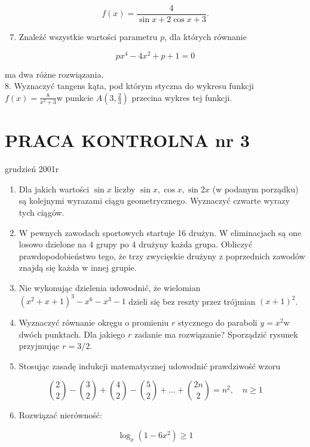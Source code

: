\documentclass[10pt]{article}
\begin{document}
$$
f(x)=\frac{4}{\sin x+2 \cos x+3} .
$$

\begin{enumerate}
  \setcounter{enumi}{6}
  \item Znaleźć wszystkie wartości parametru $p$, dla których równanie
\end{enumerate}

$$
p x^{4}-4 x^{2}+p+1=0
$$

ma dwa różne rozwiązania.\\
8. Wyznaczyć tangens kąta, pod którym styczna do wykresu funkcji $f(x)=\frac{8}{x^{2}+3} \mathrm{w}$ punkcie $A\left(3, \frac{2}{3}\right)$ przecina wykres tej funkcji.

\section*{PRACA KONTROLNA nr 3}
grudzień 2001r

\begin{enumerate}
  \item Dla jakich wartości $\sin x$ liczby $\sin x, \cos x, \sin 2 x$ (w podanym porządku) są kolejnymi wyrazami ciągu geometrycznego. Wyznaczyć czwarte wyrazy tych ciągów.
  \item W pewnych zawodach sportowych startuje 16 drużyn. W eliminacjach są one losowo dzielone na 4 grupy po 4 drużyny każda grupa. Obliczyć prawdopodobieństwo tego, że trzy zwycięskie drużyny z poprzednich zawodów znajdą się każda w innej grupie.
  \item Nie wykonując dzielenia udowodnić, że wielomian $\left(x^{2}+x+1\right)^{3}-x^{6}-x^{3}-1$ dzieli się bez reszty przez trójmian $(x+1)^{2}$.
  \item Wyznaczyć równanie okręgu o promieniu $r$ stycznego do paraboli $y=x^{2} \mathrm{w}$ dwóch punktach. Dla jakiego $r$ zadanie ma rozwiązanie? Sporządzić rysunek przyjmując $r=3 / 2$.
  \item Stosując zasadę indukcji matematycznej udowodnić prawdziwość wzoru
\end{enumerate}

$$
\binom{2}{2}-\binom{3}{2}+\binom{4}{2}-\binom{5}{2}+\ldots+\binom{2 n}{2}=n^{2}, \quad n \geqslant 1
$$

\begin{enumerate}
  \setcounter{enumi}{5}
  \item Rozwiązać nierówność:
\end{enumerate}

$$
\log _{x}\left(1-6 x^{2}\right) \geqslant 1
$$
\end{document}
